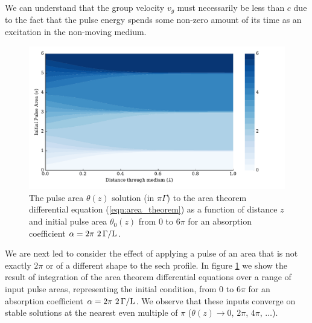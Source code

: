     We can understand that the group velocity $v_g$ must necessarily be less
    than $c$ due to the fact that the pulse energy spends some non-zero amount
    of its time as an excitation in the non-moving medium.

    \begin{figure}[]
      \includegraphics[width=\linewidth]
        {figs/03_nonlinear/plot_area_theorem_cmap_fig1.pdf}
      \caption{
        The pulse area $\theta(z)$ solution (in $\pi \Gamma$) to the area
        theorem differential equation (\ref{eqn:area_theorem}) as a function of
        distance $z$ and initial pulse area $\theta_0(z)$ from $0$ to $6\pi$ for
        an absorption coefficient $\alpha =  \unit[2\pi~2]{\Gamma/L}$.
      }
      \label{fig:area_theorem_cmap}
    \end{figure}

    We are next led to consider the effect of applying a pulse of an area that
    is not exactly $2\pi$ or of a different shape to the sech profile. In figure
    \ref{fig:area_theorem_cmap} we show the result of integration of the area
    theorem differential equations over a range of input pulse areas,
    representing the initial condition, from $0$ to $6\pi$ for an absorption
    coefficient $\alpha =  \unit[2\pi~2]{\Gamma/L}$. We observe that these
    inputs converge on stable solutions at the nearest even multiple of $\pi$
    (\ie $\theta(z) \rightarrow 0$, $2\pi$, $4\pi$, $\dots$).

